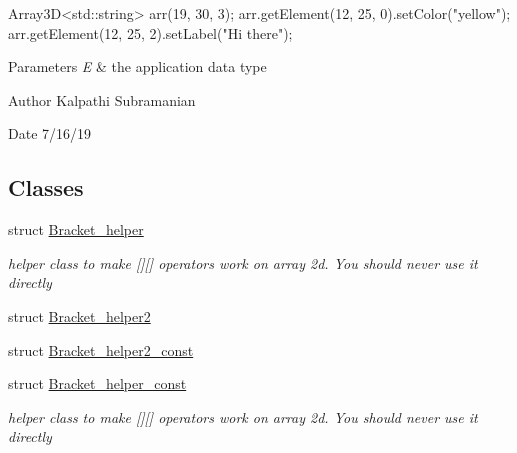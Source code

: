 \begin{DoxyCode}
Array3D<std::string> arr(19, 30, 3);
arr.getElement(12, 25, 0).setColor(\textcolor{stringliteral}{"yellow"});
arr.getElement(12, 25, 2).setLabel(\textcolor{stringliteral}{"Hi there"});
\end{DoxyCode}



\begin{DoxyParams}{Parameters}
{\em E} & the application data type\\
\hline
\end{DoxyParams}
\begin{DoxyAuthor}{Author}
Kalpathi Subramanian 
\end{DoxyAuthor}
\begin{DoxyDate}{Date}
7/16/19 
\end{DoxyDate}
\subsection*{Classes}
\begin{DoxyCompactItemize}
\item 
struct \hyperlink{structbridges_1_1datastructure_1_1_array3_d_1_1_bracket__helper}{Bracket\+\_\+helper}
\begin{DoxyCompactList}\small\item\em helper class to make \mbox{[}\mbox{]}\mbox{[}\mbox{]} operators work on array 2d. You should never use it directly \end{DoxyCompactList}\item 
struct \hyperlink{structbridges_1_1datastructure_1_1_array3_d_1_1_bracket__helper2}{Bracket\+\_\+helper2}
\item 
struct \hyperlink{structbridges_1_1datastructure_1_1_array3_d_1_1_bracket__helper2__const}{Bracket\+\_\+helper2\+\_\+const}
\item 
struct \hyperlink{structbridges_1_1datastructure_1_1_array3_d_1_1_bracket__helper__const}{Bracket\+\_\+helper\+\_\+const}
\begin{DoxyCompactList}\small\item\em helper class to make \mbox{[}\mbox{]}\mbox{[}\mbox{]} operators work on array 2d. You should never use it directly \end{DoxyCompactList}\end{DoxyCompactItemize}
